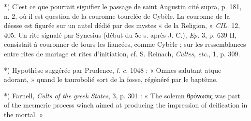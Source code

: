 \documentclass[a4paper, 11pt, oneside, polutonikogreek, french]{article}
\begin{document}
*) C'est ce que pourrait signifier le passage de saint Augustin cité supra, p. 181, n. 2, où il est question de la couronne tourelée de Cybèle. La couronne de la déesse est figurée sur un autel dédié par des mystes « de la Religion, » \emph{CIL.} 12, 405. Un rite signalé par Synesius (début du 5e s. après J. C.), \emph{Ep.} 3, p. 639 H, consistait à couronner de tours les fiancées, comme Cybèle ; sur les ressemblances entre rites de mariage et rites d'initiation, cf. S. Reinach, \emph{Cultes}, \emph{etc.}, 1, p. 309.

*) Hypothèse suggérée par Prudence, \emph{l. c.} 1048 : « Omnes salutant atque adorant, » quand le taurobolié sort de la fosse, régénéré par le baptême.

*) Farnell, \emph{Cults of the greek States}, 3, p. 301 : « The solemn θρόνωσις was part of the mesmeric process winch aimed at producing the impression of deification in the mortal. »
\end{document}
